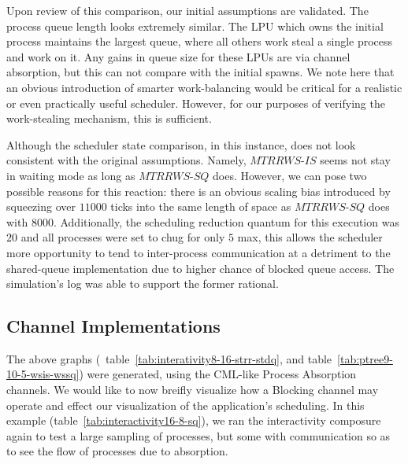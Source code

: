 Upon review of this comparison, our initial assumptions are validated. The process queue
length looks extremely similar. The LPU which owns the initial process maintains the 
largest queue, where all others work steal a single process and work on it. Any gains in
queue size for these LPUs are via channel absorption, but this can not compare with the
initial spawns. We note here that an obvious introduction of smarter work-balancing
would be critical for a realistic or even practically useful scheduler. However, for our
purposes of verifying the work-stealing mechanism, this is sufficient.

Although the scheduler state comparison, in this instance, does not look consistent with 
the original assumptions. Namely, $MTRRWS$-$IS$ seems not stay in waiting mode as long
as $MTRRWS$-$SQ$ does. However, we can pose two possible reasons for this reaction:
there is an obvious scaling bias introduced by squeezing over $11000$ ticks into the same length
of space as $MTRRWS$-$SQ$ does with $8000$. Additionally, the scheduling reduction quantum for 
this execution was $20$ and all processes were set to chug for only $5$ max, this allows the 
scheduler more opportunity to tend to inter-process communication at a detriment to
the shared-queue implementation due to higher chance of blocked queue access.
The simulation's log was able to support the former rational.

\subsection{Channel Implementations}\label{sec:results-channel-implementations}

The above graphs (\eg~table~\ref{tab:interativity8-16-strr-stdq}, and 
table~\ref{tab:ptree9-10-5-wsis-wssq}) were generated, using the CML-like Process 
Absorption channels. We would like to now breifly visualize how a Blocking channel
may operate and effect our visualization of the application's scheduling. In this example 
(table~\ref{tab:interactivity16-8-sq}), we ran the interactivity composure again
to test a large sampling of processes, but some with communication so as to see the 
flow of processes due to absorption.

